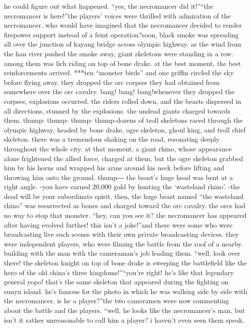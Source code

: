 he could figure out what happened.
“yes, the necromancer did it!”“the necromancer is here!”the players’ voices were thrilled with admiration of the necromancer.
who would have imagined that the necromancer decided to render firepower support instead of a feint operation?soon, black smoke was spreading all over the junction of kayang bridge across olympic highway.
as the wind from the han river pushed the smoke away, giant skeletons were standing in a row.
 among them was lich riding on top of bone drake.
at the best moment, the best reinforcements arrived.
***ten “monster birds” and one griffin circled the sky before flying away.
 they dropped the orc corpses they had obtained from somewhere over the orc cavalry.
bang! bang! bang!whenever they dropped the corpses, explosions occurred.
 the riders rolled down, and the beasts dispersed in all directions, stunned by the explosions.
the undead giants charged towards them.
thump- thump- thump- thump-dozens of troll skeletons raced through the olympic highway, headed by bone drake, ogre skeleton, ghoul king, and troll chief skeleton.
there was a tremendous shaking on the road, resonating deeply throughout the whole city.
at that moment, a giant rhino, whose appearance alone frightened the allied force, charged at them, but the ogre skeleton grabbed him by his horns and wrapped his arms around his neck before lifting and throwing him onto the ground.
thump―
the beast’s huge head was bent at a right angle.
-you have earned 20,000 gold by hunting the ‘wasteland rhino’.
-the dead will be your subordinate spirit.
then, the huge beast named “the wasteland rhino” was resurrected as bones and charged toward the orc cavalry.
 the orcs had no way to stop that monster.
“hey, can you see it? the necromancer has appeared after having evolved further! this isn’t a joke!”and there were some who were broadcasting live such scenes with their own private broadcasting devices.
 they were independent players, who were filming the battle from the roof of a nearby building with the man with the cameraman’s job leading them.
“well, look over there! the skeleton knight on top of bone drake is sweeping the battlefield like the hero of the old china’s three kingdoms!”“you’re right! he’s like that legendary general yopo! that’s the same skeleton that appeared during the fighting on sunyu island.
 he’s famous for the photo in which he was walking side by side with the necromancer.
 is he a player?”the two cameramen were now commenting about the battle and the players.
“well, he looks like the necromancer’s man, but isn’t it rather unreasonable to call him a player? i haven’t even seen them speak.
